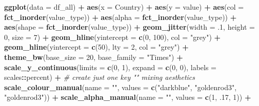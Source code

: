 \documentclass[]{book}
\newenvironment{Shaded}{\begin{snugshade}}{\end{snugshade}}
\newcommand{\KeywordTok}[1]{\textcolor[rgb]{0.13,0.29,0.53}{\textbf{#1}}}
\newcommand{\DataTypeTok}[1]{\textcolor[rgb]{0.13,0.29,0.53}{#1}}
\newcommand{\DecValTok}[1]{\textcolor[rgb]{0.00,0.00,0.81}{#1}}
\newcommand{\StringTok}[1]{\textcolor[rgb]{0.31,0.60,0.02}{#1}}
\newcommand{\CommentTok}[1]{\textcolor[rgb]{0.56,0.35,0.01}{\textit{#1}}}
\newcommand{\OperatorTok}[1]{\textcolor[rgb]{0.81,0.36,0.00}{\textbf{#1}}}
\newcommand{\NormalTok}[1]{#1}
\theoremstyle{definition}
\theoremstyle{definition}
\theoremstyle{definition}
\theoremstyle{remark}
\begin{document}
\begin{Shaded}
\begin{Highlighting}[]
\KeywordTok{ggplot}\NormalTok{(}\DataTypeTok{data =}\NormalTok{ df_all) }\OperatorTok{+}
\StringTok{  }\KeywordTok{aes}\NormalTok{(}\DataTypeTok{x =}\NormalTok{ Country) }\OperatorTok{+}
\StringTok{  }\KeywordTok{aes}\NormalTok{(}\DataTypeTok{y =}\NormalTok{ value) }\OperatorTok{+}
\StringTok{  }\KeywordTok{aes}\NormalTok{(}\DataTypeTok{col =} \KeywordTok{fct_inorder}\NormalTok{(value_type)) }\OperatorTok{+}
\StringTok{  }\KeywordTok{aes}\NormalTok{(}\DataTypeTok{alpha =} \KeywordTok{fct_inorder}\NormalTok{(value_type)) }\OperatorTok{+}
\StringTok{  }\KeywordTok{aes}\NormalTok{(}\DataTypeTok{shape =} \KeywordTok{fct_inorder}\NormalTok{(value_type)) }\OperatorTok{+}
\StringTok{  }\KeywordTok{geom_jitter}\NormalTok{(}\DataTypeTok{width =}\NormalTok{ .}\DecValTok{1}\NormalTok{, }\DataTypeTok{height =} \DecValTok{0}\NormalTok{, }\DataTypeTok{size =} \DecValTok{7}\NormalTok{) }\OperatorTok{+}
\StringTok{  }\KeywordTok{geom_hline}\NormalTok{(}\DataTypeTok{yintercept =} \KeywordTok{c}\NormalTok{(}\DecValTok{0}\NormalTok{, }\DecValTok{100}\NormalTok{), }\DataTypeTok{col =} \StringTok{"grey"}\NormalTok{) }\OperatorTok{+}
\StringTok{  }\KeywordTok{geom_hline}\NormalTok{(}\DataTypeTok{yintercept =} \KeywordTok{c}\NormalTok{(}\DecValTok{50}\NormalTok{), }\DataTypeTok{lty =} \DecValTok{2}\NormalTok{, }\DataTypeTok{col =} \StringTok{"grey"}\NormalTok{) }\OperatorTok{+}
\StringTok{  }\KeywordTok{theme_bw}\NormalTok{(}\DataTypeTok{base_size =} \DecValTok{20}\NormalTok{, }\DataTypeTok{base_family =} \StringTok{"Times"}\NormalTok{) }\OperatorTok{+}
\StringTok{  }\KeywordTok{scale_y_continuous}\NormalTok{(}\DataTypeTok{limits =} \KeywordTok{c}\NormalTok{(}\DecValTok{0}\NormalTok{, }\DecValTok{1}\NormalTok{), }\DataTypeTok{expand =} \KeywordTok{c}\NormalTok{(}\DecValTok{0}\NormalTok{, }\DecValTok{0}\NormalTok{), }\DataTypeTok{labels =}\NormalTok{ scales}\OperatorTok{::}\NormalTok{percent) }\OperatorTok{+}
\StringTok{  }\CommentTok{# create just one key "" mixing aesthetics}
\StringTok{  }\KeywordTok{scale_colour_manual}\NormalTok{(}\DataTypeTok{name =} \StringTok{""}\NormalTok{, }\DataTypeTok{values =} \KeywordTok{c}\NormalTok{(}\StringTok{"darkblue"}\NormalTok{, }\StringTok{"goldenrod3"}\NormalTok{, }\StringTok{"goldenrod3"}\NormalTok{)) }\OperatorTok{+}
\StringTok{  }\KeywordTok{scale_alpha_manual}\NormalTok{(}\DataTypeTok{name =} \StringTok{""}\NormalTok{, }\DataTypeTok{values =} \KeywordTok{c}\NormalTok{(}\DecValTok{1}\NormalTok{, .}\DecValTok{17}\NormalTok{, }\DecValTok{1}\NormalTok{)) }\OperatorTok{+}

\end{Highlighting}
\end{Shaded}
\end{document}
